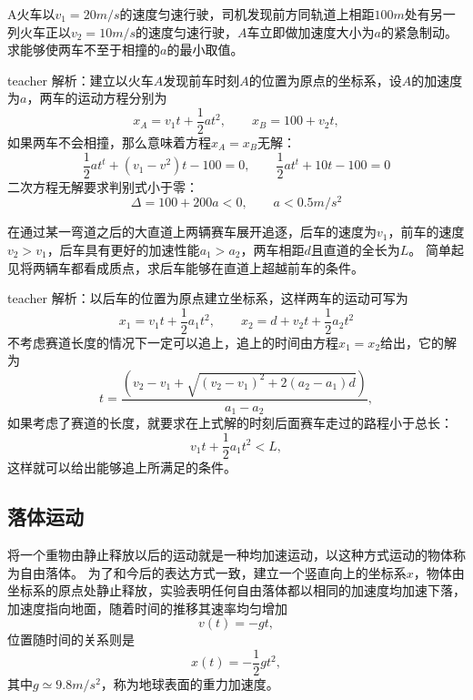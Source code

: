 \begin{example}
A火车以$v_1=20\unit{m/s}$的速度匀速行驶，司机发现前方同轨道上相距$100\unit{m}$处有另一列火车正以$v_2=10\unit{m/s}$的速度匀速行驶，$A$车立即做加速度大小为$a$的紧急制动。
求能够使两车不至于相撞的$a$的最小取值。
\begin{taggedblock}{teacher}
\newline
解析：建立以火车$A$发现前车时刻$A$的位置为原点的坐标系，设$A$的加速度为$a$，两车的运动方程分别为
\[
x_A = v_1t+\frac{1}{2}at^2,\qquad x_B = 100+v_2t,
\]
如果两车不会相撞，那么意味着方程$x_A = x_B$无解：
\[
\frac{1}{2}at^t+(v_1-v^2)t-100 = 0,\qquad \frac{1}{2}at^t+10t-100 = 0
\]
二次方程无解要求判别式小于零：
\[
\Delta  = 100+200a<0,\qquad a<0.5\unit{m/s^2}
\]
\end{taggedblock}
\end{example}




\begin{example}
在通过某一弯道之后的大直道上两辆赛车展开追逐，后车的速度为$v_1$，前车的速度$v_2>v_1$，后车具有更好的加速性能$a_1>a_2$，两车相距$d$且直道的全长为$L$。
简单起见将两辆车都看成质点，求后车能够在直道上超越前车的条件。
\begin{taggedblock}{teacher}
\newline
解析：以后车的位置为原点建立坐标系，这样两车的运动可写为
\[
x_1 = v_1t+\frac{1}{2}a_1t^2,\qquad x_2 = d+v_2t+\frac{1}{2}a_2t^2
\]
不考虑赛道长度的情况下一定可以追上，追上的时间由方程$x_1=x_2$给出，它的解为
\[
t = \frac{(v_2-v_1+\sqrt{(v_2-v_1)^2+2(a_2-a_1)d})}{a_1-a_2},
\]
如果考虑了赛道的长度，就要求在上式解的时刻后面赛车走过的路程小于总长：
\[
v_1t+\frac{1}{2}a_1t^2<L,
\]
这样就可以给出能够追上所满足的条件。
\end{taggedblock}
\end{example}





\subsection{落体运动}
将一个重物由静止释放以后的运动就是一种均加速运动，以这种方式运动的物体称为{\heiti 自由落体}。
为了和今后的表达方式一致，建立一个竖直向上的坐标系$x$，物体由坐标系的原点处静止释放，实验表明任何自由落体都以相同的加速度均加速下落，加速度指向地面，随着时间的推移其速率均匀增加
\begin{equation}
v(t) = -gt,
\end{equation}
位置随时间的关系则是
\begin{equation}
x(t) = -\frac{1}{2}gt^2,
\end{equation}
其中$g\simeq 9.8 \unit{m/s^2}$，称为地球表面的{\heiti 重力加速度}。


